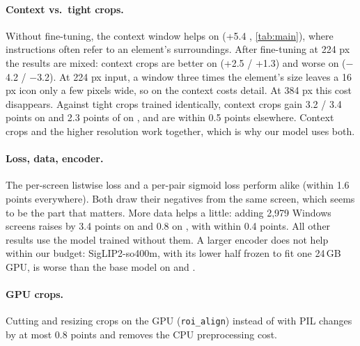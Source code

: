 \paragraph{Context vs.\ tight crops.} Without fine-tuning, the context window helps on \osw (+5.4 ,
\cref{tab:main}), where instructions often refer to an element's surroundings. After fine-tuning at 224 px the
results are mixed: context crops are better on \osw (+2.5 / +1.3) and worse on \sspro ($-$4.2 / $-$3.2). At 224 px
input, a window three times the element's size leaves a 16 px icon only a few pixels wide, so on \sspro the context
costs detail. At 384 px this cost disappears. Against tight crops trained identically, context crops gain 3.2 /
3.4 points on \sspro and 2.3 points of  on \osw, and are within 0.5 points elsewhere. Context crops and the
higher resolution work together, which is why our model uses both.

\paragraph{Loss, data, encoder.} The per-screen listwise loss and a per-pair sigmoid loss perform alike (within
1.6 points everywhere). Both draw their negatives from the same screen, which seems to be the part that matters.
More data helps a little: adding 2,979 Windows screens raises  by 3.4 points on \osw and 0.8 on \sspro,
with  within 0.4 points. All other results use the model trained without them. A larger encoder does not
help within our budget: SigLIP2-so400m, with its lower half frozen to fit one 24\,GB GPU, is worse than the base
model on \osw and \sspro.

\paragraph{GPU crops.} Cutting and resizing crops on the GPU (\texttt{roi\_align}) instead of with PIL changes
 by at most 0.8 points and removes the CPU preprocessing cost.
